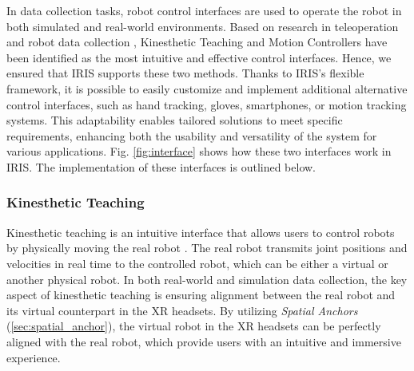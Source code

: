 In data collection tasks, robot control interfaces are used to operate the robot in both simulated and real-world environments.
Based on research in teleoperation and robot data collection \cite{jiang2024comprehensive}, Kinesthetic Teaching and Motion Controllers have been identified as the most intuitive and effective control interfaces.
Hence, we ensured that IRIS supports these two methods.
Thanks to IRIS's flexible framework, it is possible to easily customize and implement additional alternative control interfaces,
such as hand tracking, gloves, smartphones, or motion tracking systems.
This adaptability enables tailored solutions to meet specific requirements, enhancing both the usability and versatility of the system for various applications.
Fig. \ref{fig:interface} shows how these two interfaces work in IRIS. The implementation of these interfaces is outlined below.



\subsubsection{Kinesthetic Teaching}
\label{sec:kt}

Kinesthetic teaching is an intuitive interface that allows users to control robots by physically moving the real robot \cite{wrede2013user, sukkar2023guided, jiang2024comprehensive}.
The real robot transmits joint positions and velocities in real time to the controlled robot, which can be either a virtual or another physical robot.
In both real-world and simulation data collection,
the key aspect of kinesthetic teaching is ensuring alignment between the real robot and its virtual counterpart in the XR headsets.
By utilizing \textit{Spatial Anchors} (\ref{sec:spatial_anchor}), the virtual robot in the XR headsets can be perfectly aligned with the real robot, which provide users with an intuitive and immersive experience.

